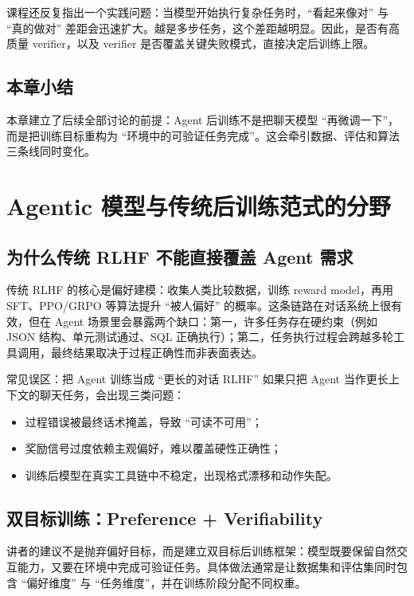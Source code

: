 \documentclass[a4paper]{article}
\begin{document}
课程还反复指出一个实践问题：当模型开始执行复杂任务时，``看起来像对'' 与 ``真的做对'' 差距会迅速扩大。越是多步任务，这个差距越明显。因此，是否有高质量 verifier，以及 verifier 是否覆盖关键失败模式，直接决定后训练上限。

\subsection{本章小结}
本章建立了后续全部讨论的前提：Agent 后训练不是把聊天模型 ``再微调一下''，而是把训练目标重构为 ``环境中的可验证任务完成''。这会牵引数据、评估和算法三条线同时变化。

\section{Agentic 模型与传统后训练范式的分野}

\subsection{为什么传统 RLHF 不能直接覆盖 Agent 需求}
传统 RLHF 的核心是偏好建模：收集人类比较数据，训练 reward model，再用 SFT、PPO/GRPO 等算法提升 ``被人偏好'' 的概率。这条链路在对话系统上很有效，但在 Agent 场景里会暴露两个缺口：第一，许多任务存在硬约束（例如 JSON 结构、单元测试通过、SQL 正确执行）；第二，任务执行过程会跨越多轮工具调用，最终结果取决于过程正确性而非表面表达。

\begin{warningbox}{常见误区：把 Agent 训练当成 ``更长的对话 RLHF''}
如果只把 Agent 当作更长上下文的聊天任务，会出现三类问题：
\begin{itemize}
    \item 过程错误被最终话术掩盖，导致 ``可读不可用''；
    \item 奖励信号过度依赖主观偏好，难以覆盖硬性正确性；
    \item 训练后模型在真实工具链中不稳定，出现格式漂移和动作失配。
\end{itemize}
\end{warningbox}

\subsection{双目标训练：Preference + Verifiability}
讲者的建议不是抛弃偏好目标，而是建立双目标后训练框架：模型既要保留自然交互能力，又要在环境中完成可验证任务。具体做法通常是让数据集和评估集同时包含 ``偏好维度'' 与 ``任务维度''，并在训练阶段分配不同权重。
\end{document}
